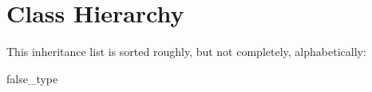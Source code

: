 \section{Class Hierarchy}
This inheritance list is sorted roughly, but not completely, alphabetically\-:\begin{DoxyCompactList}
\item false\-\_\-type\begin{DoxyCompactList}
\item {}
\end{DoxyCompactList}
\item {}
\end{DoxyCompactList}

